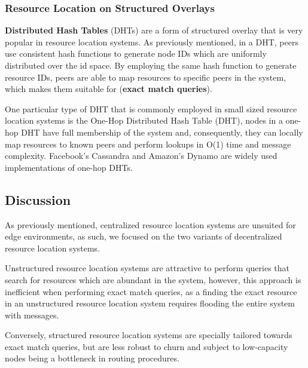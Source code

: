 \subsubsection{Resource Location on Structured Overlays}

\textbf{Distributed Hash Tables} (DHTs) are a form of structured overlay that is very popular in resource location systems. As previously mentioned, in a DHT, peers use consistent hash functions to generate node IDs which are uniformly distributed over the id space. By employing the same hash function to generate resource IDs, peers are able to map resources to specific peers in the system, which makes them suitable for (\textbf{exact match queries}).

One particular type of DHT that is commonly employed in small sized resource location systems is the One-Hop Distributed Hash Table (DHT), nodes in a one-hop DHT have full membership of the system and, consequently, they can locally map resources to known peers and perform lookups in O(1) time and message complexity. Facebook's Cassandra \cite{lakshman2010cassandra} and Amazon's Dynamo \cite{decandia2007dynamo} are widely used implementations of one-hop DHTs. 

\subsection{Discussion}

As previously mentioned, centralized resource location systems are unsuited for edge environments, as such, we focused on the two variants of decentralized resource location systems.

Unstructured resource location systems are attractive to perform queries that search for resources which are abundant in the system, however, this approach is inefficient when performing exact match queries, as a finding the exact resource in an unstructured resource location system requires flooding the entire system with messages.

Conversely, structured resource location systems are specially tailored towards exact match queries, but are less robust to churn and subject to low-capacity nodes being a bottleneck in routing procedures. 



